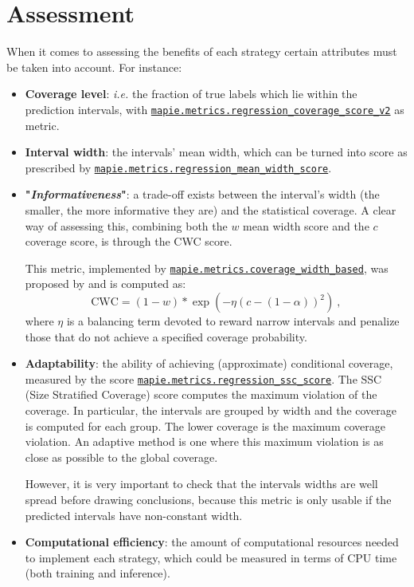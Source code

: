 \section{Assessment}\label{sec:assessment}

When it comes to assessing the benefits of each strategy certain attributes must be taken into account. For instance:
\begin{itemize}
    \item \textbf{Coverage level}: \textit{i.e.} the fraction of true labels which lie within the prediction intervals, with \href{https://mapie.readthedocs.io/en/stable/generated/mapie.metrics.regression_coverage_score_v2.html#mapie.metrics.regression_coverage_score}{\texttt{mapie.metrics.regression\_{}coverage\_{}score\_{}v2}} as metric.
    \item \textbf{Interval width}: the intervals' mean width, which can be turned into score as prescribed by \href{https://mapie.readthedocs.io/en/stable/generated/mapie.metrics.regression_mean_width_score.html} {\texttt{mapie.metrics.regression\_{}mean\_{}width\_{}score}}.
    \item \textbf{"\textit{Informativeness}"}: a trade-off exists between the interval's width (the smaller, the more informative they are) and the statistical coverage. A clear way of assessing this, combining both the $w$ mean width score and the $c$ coverage score, is through the CWC score. 
    
    This metric, implemented by \href{https://mapie.readthedocs.io/en/latest/theoretical_description_metrics.html#coverage-width-based-criterion}{\texttt{mapie.metrics.coverage\_{}width\_{}based}}, was proposed by \cite{khosravi} and is computed as:
    $$ \mathrm{CWC} = (1 - w) * \exp{\left(-\eta (c - (1-\alpha))^2\right)}\ , $$
    where $\eta$ is a balancing term devoted to reward narrow intervals and penalize those that do not achieve a specified coverage probability. 
    \item \textbf{Adaptability}: the ability of achieving (approximate) conditional coverage, measured by the score \href{https://mapie.readthedocs.io/en/stable/generated/mapie.metrics.regression_ssc_score.html#mapie-metrics-regression-ssc-score}{\texttt{mapie.metrics.regression\_{}ssc\_{}score}}. The SSC (Size Stratified Coverage) score computes the maximum violation of the coverage. In particular, the intervals are grouped by width and the coverage is computed for each group. The lower coverage is the maximum coverage violation. An adaptive method is one where this maximum violation is as close as possible to the global coverage. 

    However, it is very important to check that the intervals widths are well spread before drawing conclusions, because this metric is only usable if the predicted intervals have non-constant width.    
    \item \textbf{Computational efficiency}: the amount of computational resources needed to implement each strategy, which could be measured in terms of CPU time (both training and inference).

\end{itemize}
